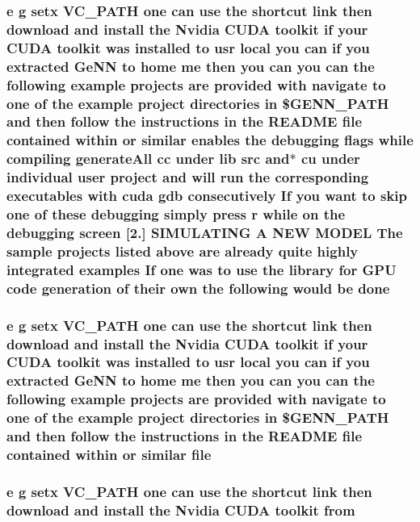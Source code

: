 \hypertarget{README_8txt_a65776961365fe8f230a95dab49b0dfa2}{
\subsubsection[{done}]{\setlength{\rightskip}{0pt plus 5cm}e g setx V\+C\+\_\+\+P\+A\+T\+H one can {\bf use} the shortcut link then download and install the Nvidia C\+U\+D\+A toolkit if your C\+U\+D\+A toolkit was installed {\bf to} usr local you can if you extracted {\bf Ge\+N\+N} {\bf to} home me then you can you can the following example projects are provided {\bf with} navigate {\bf to} one of the example {\bf project} directories {\bf in} \$G\+E\+N\+N\+\_\+\+P\+A\+T\+H and then follow the instructions {\bf in} the R\+E\+A\+D\+M\+E {\bf file} contained within {\bf or} similar enables the debugging flags while compiling generate\+All cc under lib src and$\ast$ cu under individual user {\bf project} and will run the corresponding executables {\bf with} {\bf cuda} gdb consecutively If you want {\bf to} skip one of these debugging simply press r while on the debugging screen \mbox{[}2.\mbox{]} S\+I\+M\+U\+L\+A\+T\+I\+N\+G A N\+E\+W M\+O\+D\+E\+L The sample projects listed above are already quite highly integrated examples If one was {\bf to} {\bf use} the library for {\bf G\+P\+U} {\bf code} generation of their own the following would be done}}\label{README_8txt_a65776961365fe8f230a95dab49b0dfa2}
\hypertarget{README_8txt_a6f45b2930c1b79b67034355b4701dc56}{
\subsubsection[{file}]{\setlength{\rightskip}{0pt plus 5cm}e g setx V\+C\+\_\+\+P\+A\+T\+H one can {\bf use} the shortcut link then download and install the Nvidia C\+U\+D\+A toolkit if your C\+U\+D\+A toolkit was installed {\bf to} usr local you can if you extracted {\bf Ge\+N\+N} {\bf to} home me then you can you can the following example projects are provided {\bf with} navigate {\bf to} one of the example {\bf project} directories {\bf in} \$G\+E\+N\+N\+\_\+\+P\+A\+T\+H and then follow the instructions {\bf in} the R\+E\+A\+D\+M\+E file contained within {\bf or} similar file}}\label{README_8txt_a6f45b2930c1b79b67034355b4701dc56}
\hypertarget{README_8txt_aa96a977025ecc6f44756d8c7ce4f7674}{
\subsubsection[{from}]{\setlength{\rightskip}{0pt plus 5cm}e g setx V\+C\+\_\+\+P\+A\+T\+H one can {\bf use} the shortcut link then download and install the Nvidia C\+U\+D\+A toolkit from}}\label{README_8txt_aa96a977025ecc6f44756d8c7ce4f7674}
